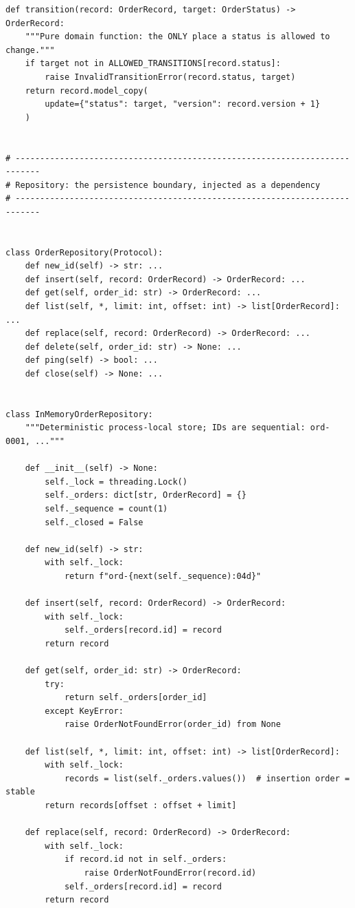 \begin{verbatim}
def transition(record: OrderRecord, target: OrderStatus) -> OrderRecord:
    """Pure domain function: the ONLY place a status is allowed to change."""
    if target not in ALLOWED_TRANSITIONS[record.status]:
        raise InvalidTransitionError(record.status, target)
    return record.model_copy(
        update={"status": target, "version": record.version + 1}
    )


# ---------------------------------------------------------------------------
# Repository: the persistence boundary, injected as a dependency
# ---------------------------------------------------------------------------


class OrderRepository(Protocol):
    def new_id(self) -> str: ...
    def insert(self, record: OrderRecord) -> OrderRecord: ...
    def get(self, order_id: str) -> OrderRecord: ...
    def list(self, *, limit: int, offset: int) -> list[OrderRecord]: ...
    def replace(self, record: OrderRecord) -> OrderRecord: ...
    def delete(self, order_id: str) -> None: ...
    def ping(self) -> bool: ...
    def close(self) -> None: ...


class InMemoryOrderRepository:
    """Deterministic process-local store; IDs are sequential: ord-0001, ..."""

    def __init__(self) -> None:
        self._lock = threading.Lock()
        self._orders: dict[str, OrderRecord] = {}
        self._sequence = count(1)
        self._closed = False

    def new_id(self) -> str:
        with self._lock:
            return f"ord-{next(self._sequence):04d}"

    def insert(self, record: OrderRecord) -> OrderRecord:
        with self._lock:
            self._orders[record.id] = record
        return record

    def get(self, order_id: str) -> OrderRecord:
        try:
            return self._orders[order_id]
        except KeyError:
            raise OrderNotFoundError(order_id) from None

    def list(self, *, limit: int, offset: int) -> list[OrderRecord]:
        with self._lock:
            records = list(self._orders.values())  # insertion order = stable
        return records[offset : offset + limit]

    def replace(self, record: OrderRecord) -> OrderRecord:
        with self._lock:
            if record.id not in self._orders:
                raise OrderNotFoundError(record.id)
            self._orders[record.id] = record
        return record


\end{verbatim}
